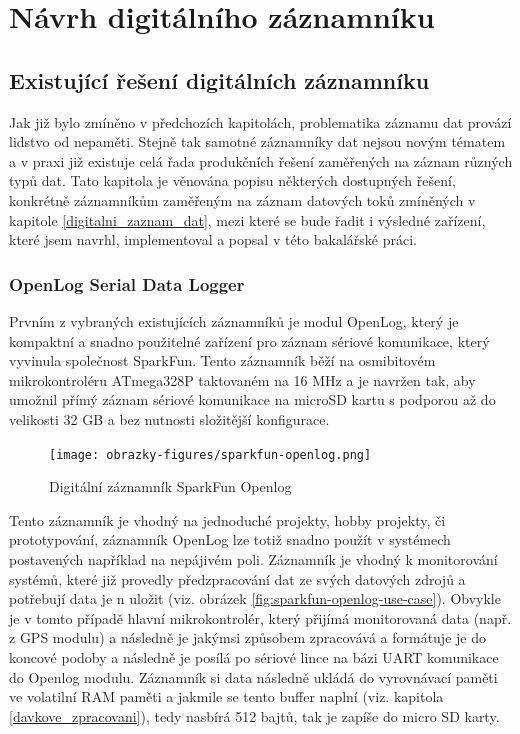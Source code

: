 \chapter{Návrh digitálního záznamníku}
\label{navrh_digitalniho_zaznamniku}

\section{Existující řešení digitálních záznamníku}
Jak již bylo zmíněno v předchozích kapitolách, problematika záznamu dat provází lidstvo od nepaměti. Stejně tak samotné záznamníky dat nejsou novým tématem a v praxi již existuje celá řada produkčních řešení zaměřených na záznam různých typů dat. Tato kapitola je věnována popisu některých dostupných řešení, konkrétně záznamníkům zaměřeným na záznam datových toků zmíněných v kapitole \ref{digitalni_zaznam_dat}, mezi které se bude řadit i výsledné zařízení, které jsem navrhl, implementoval a popsal v této bakalářské práci. 


\subsection{OpenLog Serial Data Logger}
\label{openlog_serial_datalogger_module}
Prvním z vybraných existujících záznamníků je modul OpenLog, který je kompaktní a snadno použitelné zařízení pro záznam sériové komunikace, který vyvinula společnost SparkFun. Tento záznamník běží na osmibitovém mikrokontroléru ATmega328P taktovaném na 16 MHz a je navržen tak, aby umožnil přímý záznam sériové komunikace na microSD kartu s podporou až do velikosti 32 GB a bez nutnosti složitější konfigurace. \cite{sparkfun_openlog_tutorial}

\begin{figure}[h]
    \centering
    \texttt{[image: obrazky-figures/sparkfun-openlog.png]}
    
    \caption{Digitální záznamník SparkFun Openlog \cite{cirkit_openlog}}
    \label{fig:sparkfun-openlog}
\end{figure}

Tento záznamník je vhodný na jednoduché projekty, hobby projekty, či prototypování, záznamník OpenLog lze totiž snadno použít v systémech postavených například na nepájivém poli. Záznamník je vhodný k monitorování systémů, které již provedly předzpracování dat ze svých datových zdrojů a potřebují data je
n uložit (viz. obrázek \ref{fig:sparkfun-openlog-use-case}). Obvykle je v tomto případě hlavní mikrokontrolér, který přijímá monitorovaná data (např. z GPS modulu) a následně je jakýmsi způsobem zpracovává a formátuje je do koncové podoby a následně je posílá po sériové lince na bázi UART komunikace do Openlog modulu. Záznamník si data následně ukládá do vyrovnávací paměti ve volatilní RAM paměti a jakmile se tento buffer naplní (viz. kapitola \ref{davkove_zpracovani}), tedy nasbírá 512 bajtů, tak je zapíše do micro SD karty. \cite{cirkit_openlog}

